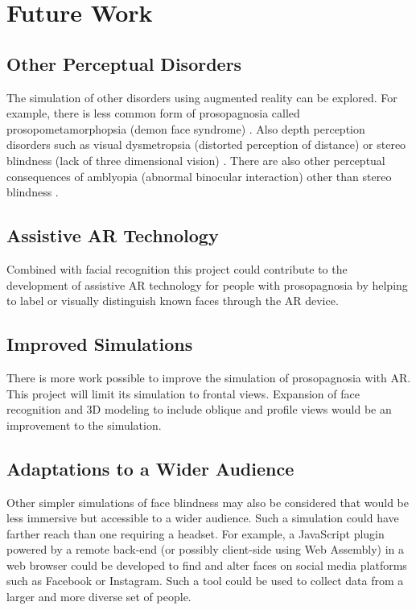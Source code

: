 \documentclass{article}
\begin{document}
    \section{Future Work}
    
    \subsection{Other Perceptual Disorders}
    The simulation of other disorders using augmented reality can be explored. For example, there is less common form of prosopagnosia called prosopometamorphopsia (demon face syndrome) \cite{herald_2023}. Also depth perception disorders such as visual dysmetropsia (distorted perception of distance) \cite{lanska_2017} or stereo blindness (lack of three dimensional vision) \cite{richards_1970}. There are also other perceptual consequences of amblyopia (abnormal binocular interaction)  other than stereo blindness \cite{vonnoorden_2001}.

    \subsection{Assistive AR Technology}
    Combined with facial recognition this project could contribute to the development of assistive AR technology for people with prosopagnosia by helping to label or visually distinguish known faces through the AR device.

    \subsection{Improved Simulations}
    There is more work possible to improve the simulation of prosopagnosia with AR. This project will limit its simulation to frontal views. Expansion of face recognition and 3D modeling to include oblique and profile views would be an improvement to the simulation.

    \subsection{Adaptations to a Wider Audience}
    Other simpler simulations of face blindness may also be considered that would be less immersive but accessible to a wider audience. Such a simulation could have farther reach than one requiring a headset. For example, a JavaScript plugin powered by a remote back-end (or possibly client-side using Web Assembly) in a web browser could be developed to find and alter faces on social media platforms such as Facebook or Instagram. Such a tool could be used to collect data from a larger and more diverse set of people.
    
    
\end{document}

